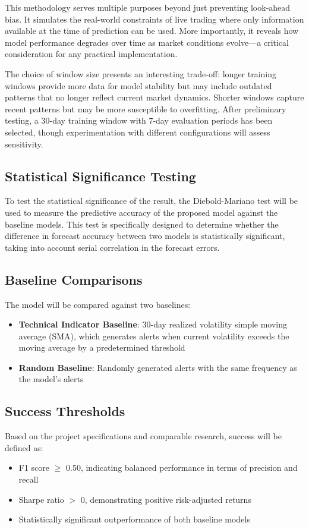 \documentclass[11pt,twocolumn]{article}
\begin{document}
This methodology serves multiple purposes beyond just preventing look-ahead bias. It simulates the real-world constraints of live trading where only information available at the time of prediction can be used. More importantly, it reveals how model performance degrades over time as market conditions evolve—a critical consideration for any practical implementation.

The choice of window size presents an interesting trade-off: longer training windows provide more data for model stability but may include outdated patterns that no longer reflect current market dynamics. Shorter windows capture recent patterns but may be more susceptible to overfitting. After preliminary testing, a 30-day training window with 7-day evaluation periods has been selected, though experimentation with different configurations will assess sensitivity.

\subsection{\textbf{Statistical Significance Testing}}
To test the statistical significance of the result, the Diebold-Mariano test will be used to measure the predictive accuracy of the proposed model against the baseline models. This test is specifically designed to determine whether the difference in forecast accuracy between two models is statistically significant, taking into account serial correlation in the forecast errors.

\subsection{\textbf{Baseline Comparisons}}
The model will be compared against two baselines:
\begin{itemize}
\item \textbf{Technical Indicator Baseline}: 30-day realized volatility simple moving average (SMA), which generates alerts when current volatility exceeds the moving average by a predetermined threshold
\item \textbf{Random Baseline}: Randomly generated alerts with the same frequency as the model's alerts
\end{itemize}

\subsection{\textbf{Success Thresholds}}
Based on the project specifications and comparable research, success will be defined as:
\begin{itemize}
\item F1 score $\geq$ 0.50, indicating balanced performance in terms of precision and recall
\item Sharpe ratio $>$ 0, demonstrating positive risk-adjusted returns
\item Statistically significant outperformance of both baseline models
\end{itemize}
\end{document}
